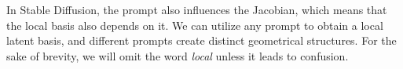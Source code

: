 {In Stable Diffusion, the prompt also influences the Jacobian, which means that the local basis also depends on it. }
{
We can utilize any prompt to obtain a local latent basis, and different prompts create distinct geometrical structures.
}
{For the sake of brevity, we will omit the word {\it local} unless it leads to confusion.}



